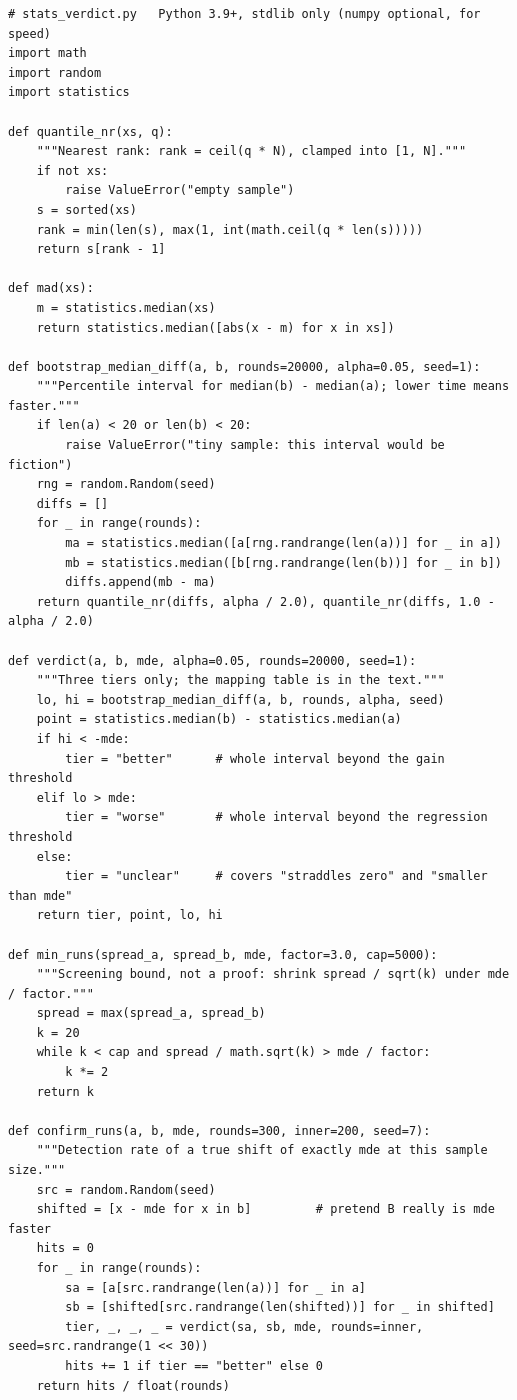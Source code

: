 \documentclass[12pt,a4paper,fontset=fandol]{ctexbook}
\newcommand{\Tp}[1]{\texttt{#1}}
\newcommand{\Lang}[1]{\textsf{#1}}
\newcommand{\PY}{\Lang{Python}}
\begin{document}
\begin{lstlisting}[style=pythonstyle, caption={\textbf{可跑}：bootstrap 中位数差、三档判据、按 MDE 估最小重复次数与检出率复核（\PY 标准库实现，\Tp{numpy} 只用于加速；\texttt{\_\_main\_\_} 里的数据是合成的）}, label={lst:pm03-bootstrap}]
# stats_verdict.py   Python 3.9+, stdlib only (numpy optional, for speed)
import math
import random
import statistics

def quantile_nr(xs, q):
    """Nearest rank: rank = ceil(q * N), clamped into [1, N]."""
    if not xs:
        raise ValueError("empty sample")
    s = sorted(xs)
    rank = min(len(s), max(1, int(math.ceil(q * len(s)))))
    return s[rank - 1]

def mad(xs):
    m = statistics.median(xs)
    return statistics.median([abs(x - m) for x in xs])

def bootstrap_median_diff(a, b, rounds=20000, alpha=0.05, seed=1):
    """Percentile interval for median(b) - median(a); lower time means faster."""
    if len(a) < 20 or len(b) < 20:
        raise ValueError("tiny sample: this interval would be fiction")
    rng = random.Random(seed)
    diffs = []
    for _ in range(rounds):
        ma = statistics.median([a[rng.randrange(len(a))] for _ in a])
        mb = statistics.median([b[rng.randrange(len(b))] for _ in b])
        diffs.append(mb - ma)
    return quantile_nr(diffs, alpha / 2.0), quantile_nr(diffs, 1.0 - alpha / 2.0)

def verdict(a, b, mde, alpha=0.05, rounds=20000, seed=1):
    """Three tiers only; the mapping table is in the text."""
    lo, hi = bootstrap_median_diff(a, b, rounds, alpha, seed)
    point = statistics.median(b) - statistics.median(a)
    if hi < -mde:
        tier = "better"      # whole interval beyond the gain threshold
    elif lo > mde:
        tier = "worse"       # whole interval beyond the regression threshold
    else:
        tier = "unclear"     # covers "straddles zero" and "smaller than mde"
    return tier, point, lo, hi

def min_runs(spread_a, spread_b, mde, factor=3.0, cap=5000):
    """Screening bound, not a proof: shrink spread / sqrt(k) under mde / factor."""
    spread = max(spread_a, spread_b)
    k = 20
    while k < cap and spread / math.sqrt(k) > mde / factor:
        k *= 2
    return k

def confirm_runs(a, b, mde, rounds=300, inner=200, seed=7):
    """Detection rate of a true shift of exactly mde at this sample size."""
    src = random.Random(seed)
    shifted = [x - mde for x in b]         # pretend B really is mde faster
    hits = 0
    for _ in range(rounds):
        sa = [a[src.randrange(len(a))] for _ in a]
        sb = [shifted[src.randrange(len(shifted))] for _ in shifted]
        tier, _, _, _ = verdict(sa, sb, mde, rounds=inner, seed=src.randrange(1 << 30))
        hits += 1 if tier == "better" else 0
    return hits / float(rounds)


\end{lstlisting}
\end{document}
